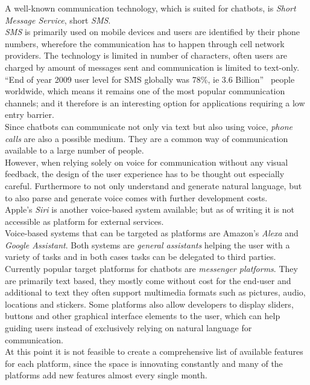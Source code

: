 A well-known communication technology, which is suited for chatbots, is \emph{Short Message Service}, short \emph{SMS}.
\\
\emph{SMS} is primarily used on mobile devices and users are identified by their phone numbers,
wherefore the communication has to happen through cell network providers.
The technology is limited in number of characters, often users are charged by amount of messages sent and communication is limited to text-only.
``End of year 2009 user level for SMS globally was 78\%, ie 3.6 Billion''~\cite{mobilenumbers} people worldwide,
which means it remains one of the most popular communication channels;
and it therefore is an interesting option for applications requiring a low entry barrier.
\\

Since chatbots can communicate not only via text but also using voice, \emph{phone calls} are also a possible medium.
They are a common way of communication available to a large number of people.
\\
However, when relying solely on voice for communication without any visual feedback, the design of the user experience has to be thought out especially careful.
Furthermore to not only understand and generate natural language,
but to also parse and generate voice comes with further development costs.
\\

Apple's \emph{Siri} is another voice-based system available; but as of writing it is not accessible as platform for external services.
\\
Voice-based systems that can be targeted as platforms are Amazon's \emph{Alexa} and \emph{Google Assistant}.
Both systems are \emph{general assistants} helping the user with a variety of tasks
and in both cases tasks can be delegated to third parties.
\\

Currently popular target platforms for chatbots are \emph{messenger platforms}.
They are primarily text based, they mostly come without cost for the end-user and additional to text they often support multimedia formats such as pictures, audio, locations and stickers.
Some platforms also allow developers to display sliders, buttons and other graphical interface elements to the user, which can help guiding users instead of exclusively relying on natural language for communication.
\\
At this point it is not feasible to create a comprehensive list of available features for each platform, since the space is innovating constantly and many of the platforms add new features almost every single month.
\\


